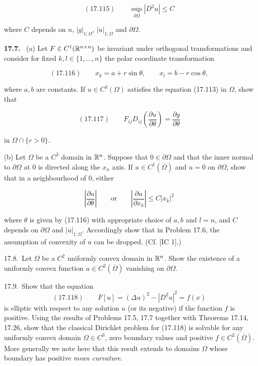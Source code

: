 \begin{equation}
(17.115) \qquad \sup_{\partial\Omega} |D^2u| \le C
\end{equation}

where $C$ depends on $n$, $|g|_{1;\Omega}$, $|u|_{1;\Omega}$ and $\partial\Omega$.

\textbf{17.7.} \ (a) Let $F \in C^1(\mathbb{R}^{n \times n})$ be invariant under orthogonal transformations and
consider for fixed $k,l \in \{1, \dots, n\}$ the polar coordinate transformation

\begin{equation}
(17.116) \qquad x_k = a + r \sin \theta,\qquad x_l = b - r \cos \theta,
\end{equation}

where $a,b$ are constants. If $u \in C^3(\Omega)$ satisfies the equation (17.113) in $\Omega$, show that

\begin{equation}
(17.117) \qquad F_{ij} D_{ij}\!\left(\frac{\partial u}{\partial \theta}\right) = \frac{\partial g}{\partial \theta}
\end{equation}

in $\Omega \cap \{r>0\}$.

\hspace{1.7em}(b) Let $\Omega$ be a $C^3$ domain in $\mathbb{R}^n$. Suppose that $0 \in \partial\Omega$ and that the inner normal
to $\partial\Omega$ at $0$ is directed along the $x_n$ axis. If $u \in C^1(\overline{\Omega})$ and $u = 0$ on $\partial\Omega$, show that in a
neighbourhood of $0$, either

\[
\left|\frac{\partial u}{\partial \theta}\right| \qquad \text{or} \qquad \left|\frac{\partial u}{\partial x_k}\right| \le C|x_k|^2
\]

where $\theta$ is given by (17.116) with appropriate choice of $a,b$ and $l = n$, and $C$ depends
on $\partial\Omega$ and $|u|_{1;\Omega}$. Accordingly show that in Problem 17.6, the assumption of
convexity of $u$ can be dropped. (Cf. [IC 1].)


17.8.\ Let $\Omega$ be a $C^2$ uniformly convex domain in $\mathbb{R}^n$. Show the existence of a uniformly convex function $u \in C^2(\overline{\Omega})$ vanishing on $\partial \Omega$.

17.9.\ Show that the equation
\[
(17.118)\qquad F[u] = (\Delta u)^2 - |D^2u|^2 = f(x)
\]
is elliptic with respect to any solution $u$ (or its negative) if the function $f$ is positive. Using the results of Problems 17.5, 17.7 together with Theorems 17.14, 17.26, show that the classical Dirichlet problem for (17.118) is solvable for any uniformly convex domain $\Omega \in C^3$, zero boundary values and positive $f \in C^2(\overline{\Omega})$. More generally we note here that this result extends to domains $\Omega$ whose boundary has positive \emph{mean curvature}.

